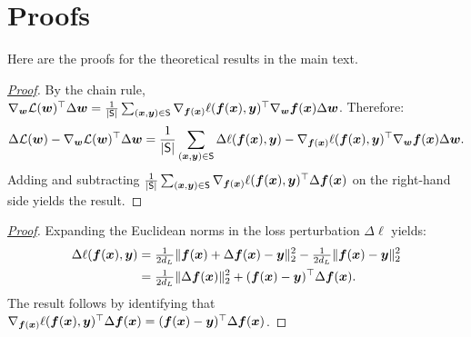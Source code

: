 \section{Proofs}
\label{app:proofs}

Here are the proofs for the theoretical results in the main text.

\decomposition*
\begin{proof}[\mbox{\hyperref[thm:decomposition]{Proof}}]\label{proof:decomposition}
By the chain rule, $\nabla_{\bm{w}}\mathcal{L}({\bm{w}})^\top \Delta {\bm{w}} = \frac{1}{|\mathsf{S}|}\sum_{({\bm{x}},{\bm{y}})\in \mathsf{S}} \nabla_{{\bm{f}}({\bm{x}})} \ell({\bm{f}}({\bm{x}}),{\bm{y}})^\top \nabla_{\bm{w}} {\bm{f}}({\bm{x}}) \Delta {\bm{w}}$. Therefore:
\begin{equation*}
    \Delta \mathcal{L}({\bm{w}}) - \nabla_{\bm{w}}\mathcal{L}({\bm{w}})^\top \Delta {\bm{w}} = \frac{1}{|\mathsf{S}|}\sum_{({\bm{x}},{\bm{y}})\in \mathsf{S}}\Delta \ell({\bm{f}}({\bm{x}}), {\bm{y}}) - \nabla_{{\bm{f}}({\bm{x}})} \ell({\bm{f}}({\bm{x}}),{\bm{y}})^\top \nabla_{\bm{w}} {\bm{f}}({\bm{x}}) \Delta {\bm{w}}.
\end{equation*}
Adding and subtracting $\frac{1}{|\mathsf{S}|}\sum_{({\bm{x}},{\bm{y}})\in \mathsf{S}}\nabla_{{\bm{f}}({\bm{x}})}\ell({\bm{f}}({\bm{x}}),{\bm{y}})^\top \Delta {\bm{f}}({\bm{x}})$ on the right-hand side yields the result.
\end{proof}

\squarebreg*
\begin{proof}[\mbox{\hyperref[lem:sq-bregman]{Proof}}]\label{proof:squarebreg}
Expanding the Euclidean norms in the loss perturbation $\Delta \ell$ yields:
\begin{align*}
    \Delta \ell({\bm{f}}({\bm{x}}), {\bm{y}}) & = \tfrac{1}{2d_L} \Vert {{\bm{f}}({\bm{x}}) + \Delta {\bm{f}}({\bm{x}}) - {\bm{y}}} \Vert_2^2 - \tfrac{1}{2d_L} \Vert {{\bm{f}}({\bm{x}}) - {\bm{y}}} \Vert_2^2 \\
    &= \tfrac{1}{2d_L} \Vert {\Delta {\bm{f}}({\bm{x}})} \Vert_2^2 + ({\bm{f}}({\bm{x}}) - {\bm{y}})^\top \Delta {\bm{f}}({\bm{x}}).
\end{align*}
The result follows by identifying that $\nabla_{{\bm{f}}({\bm{x}})}\ell({\bm{f}}({\bm{x}}),{\bm{y}})^\top \Delta {\bm{f}}({\bm{x}}) = ({\bm{f}}({\bm{x}}) - {\bm{y}})^\top \Delta {\bm{f}}({\bm{x}})$.
\end{proof}

